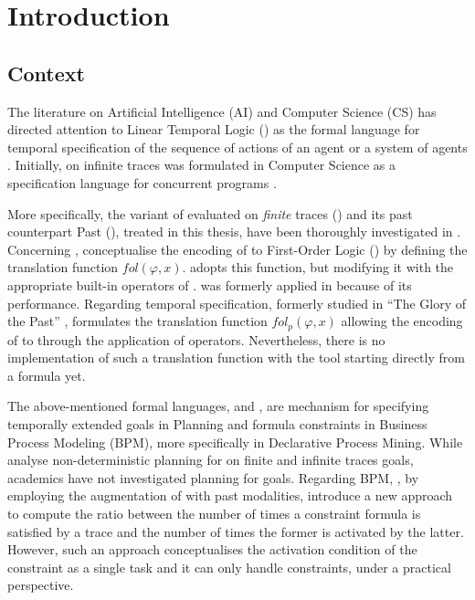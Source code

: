 \chapter{Introduction}
\section{Context}
The literature on Artificial Intelligence (AI) and Computer Science (CS) has directed attention to Linear Temporal Logic (\LTL) as the formal language for temporal specification of the sequence of actions of an agent or a system of agents \citep{fagin2004reasoning}. Initially, \LTL on infinite traces was formulated in Computer Science as a specification language for concurrent programs \citep{Pnueli:1977:TLP:1382431.1382534}.

More specifically, the variant of \LTL evaluated on \textit{finite} traces (\LTLf) and its past counterpart  Past \LTL (\PLTL), treated in this thesis, have been thoroughly investigated in \cite{de2013linear,lichtenstein1985glory}. Concerning \LTLf, \cite{de2013linear} conceptualise the encoding of \LTLf to First-Order Logic (\FOL) by defining the translation function $fol(\varphi, x)$. \cite{zpv2018} adopts this function, but modifying it with the appropriate built-in operators of \MONA. \MONA was formerly applied in \cite{zhu2017symbolic} because of its performance. Regarding \PLTL temporal specification, formerly studied in ``The Glory of the Past'' \citep{lichtenstein1985glory}, \cite{zpv2018} formulates the translation function $fol_p(\varphi, x)$ allowing the encoding of \PLTL to \FOL through the application of \MONA operators. 
Nevertheless, there is no implementation of such a translation function with the \MONA tool starting directly from a \PLTL formula yet. 

The above-mentioned formal languages, \LTLf and \PLTL, are mechanism for specifying temporally extended goals in Planning and formula constraints in Business Process Modeling (BPM), more specifically in Declarative Process Mining. While \cite{camacho2017non} analyse non-deterministic planning for \LTL on finite and infinite traces goals, academics have not investigated planning for \PLTL goals. Regarding BPM, \cite{cecconi2018interestingness}, by employing the augmentation of \LTLf with past modalities, introduce a new approach to compute the ratio between the number of times a constraint formula is satisfied by a trace and the number of times the former is activated by the latter. However, such an approach conceptualises the activation condition of the constraint as a single task and it can only handle \declare constraints, under a practical perspective.

